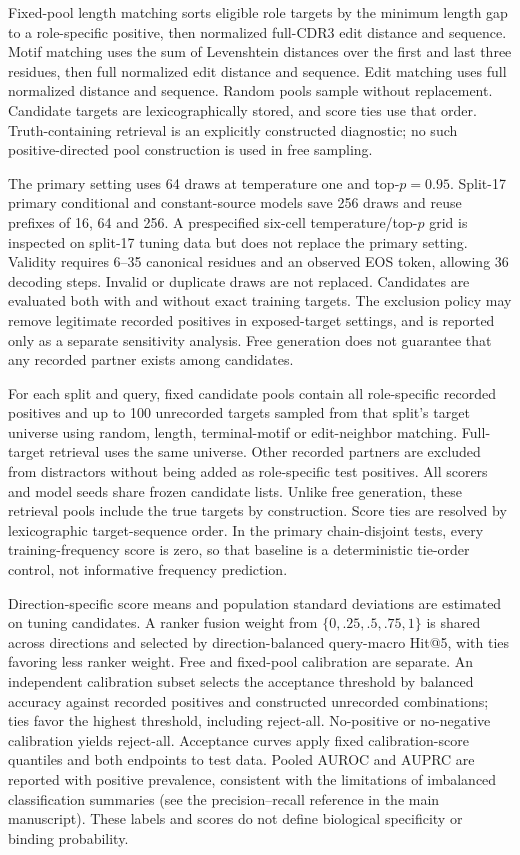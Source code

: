 \documentclass[a4paper,11pt]{article}
\begin{document}
Fixed-pool length matching sorts eligible role targets by the minimum length
gap to a role-specific positive, then normalized full-CDR3 edit distance and
sequence. Motif matching uses the sum of Levenshtein distances over the first
and last three residues, then full normalized edit distance and sequence. Edit
matching uses full normalized distance and sequence. Random pools sample
without replacement. Candidate targets are lexicographically stored, and score
ties use that order. Truth-containing retrieval is an explicitly constructed
diagnostic; no such positive-directed pool construction is used in free sampling.


The primary setting uses 64 draws at temperature one and top-$p=0.95$.
Split-17 primary conditional and constant-source models save 256 draws and
reuse prefixes of 16, 64 and 256. A prespecified six-cell temperature/top-$p$
grid is inspected on split-17 tuning data but does not replace the primary
setting. Validity requires 6--35 canonical residues and an observed EOS token,
allowing 36 decoding steps. Invalid or duplicate draws are not replaced.
Candidates are evaluated both with and without exact training targets. The
exclusion policy may remove legitimate recorded positives in exposed-target
settings, and is reported only as a separate sensitivity analysis. Free
generation does not guarantee that any recorded partner exists among candidates.

For each split and query, fixed candidate pools contain all role-specific
recorded positives and up to 100 unrecorded targets sampled from that split's
target universe using random, length, terminal-motif or edit-neighbor matching.
Full-target retrieval uses the same universe. Other recorded partners are
excluded from distractors without being added as role-specific test positives.
All scorers and model seeds share frozen candidate lists. Unlike free generation,
these retrieval pools include the true targets by construction.
Score ties are resolved by lexicographic target-sequence order. In the primary
chain-disjoint tests, every training-frequency score is zero, so that baseline
is a deterministic tie-order control, not informative frequency prediction.

Direction-specific score means and population standard deviations are estimated
on tuning candidates. A ranker fusion weight from $\{0,.25,.5,.75,1\}$ is shared
across directions and selected by direction-balanced query-macro Hit@5, with
ties favoring less ranker weight. Free and fixed-pool calibration are separate.
An independent calibration subset selects the acceptance threshold by balanced
accuracy against recorded positives and constructed unrecorded combinations;
ties favor the highest threshold, including reject-all. No-positive or
no-negative calibration yields reject-all. Acceptance curves apply fixed
calibration-score quantiles and both endpoints to test data. Pooled AUROC and
AUPRC are reported with positive prevalence, consistent with the limitations of
imbalanced classification summaries (see the precision--recall reference in the main manuscript). These labels and scores
do not define biological specificity or binding probability.
\end{document}
